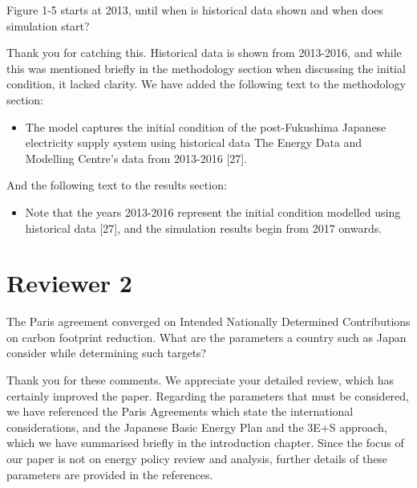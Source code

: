 \documentclass[answers,11pt]{exam}
\begin{document}
\begin{questions}
         \question Figure 1-5 starts at 2013, until when is historical data shown and when does simulation start?
        \begin{solution}
                Thank you for catching this. Historical data is shown from 2013-2016, and while this was mentioned briefly in the methodology section when discussing the initial condition, it lacked clarity. We have added the following text to the methodology section:
                \begin{itemize}
                
                \item The model captures the initial condition of the post-Fukushima Japanese electricity supply system using historical data The Energy Data and Modelling Centre’s data from 2013-2016 [27].
                \end{itemize}
                
                And the following text to the results section:
                \begin{itemize}
                
                \item Note that the years 2013-2016 represent the initial condition modelled using historical data [27], and the simulation results begin from 2017 onwards.
                
                \end{itemize}
                
        \end{solution}      
              
        
        \section*{Reviewer 2}

        \question The Paris agreement converged on Intended Nationally Determined Contributions on carbon footprint reduction. What are the parameters a country such as Japan consider while determining such targets?
        
        \begin{solution}
                Thank you for these comments. We appreciate your detailed review, which has certainly improved the paper. Regarding the parameters that must be considered, we have referenced the Paris Agreements which state the international considerations, and the Japanese Basic Energy Plan and the 3E+S approach, which we have summarised briefly in the introduction chapter. Since the focus of our paper is not on energy policy review and analysis, further details of these parameters are provided in the references.
        \end{solution}


\end{questions}
\end{document}
